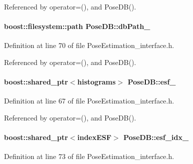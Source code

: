 Referenced by operator=(), and Pose\-D\-B().

\hypertarget{classPoseDB_ad1e3c1001be37bde48faa6502370494b}{
\paragraph[{db\-Path\-\_\-}]{\setlength{\rightskip}{0pt plus 5cm}boost\-::filesystem\-::path Pose\-D\-B\-::db\-Path\-\_\-\hspace{0.3cm}{\ttfamily [private]}}}\label{classPoseDB_ad1e3c1001be37bde48faa6502370494b}


Definition at line 70 of file Pose\-Estimation\-\_\-interface.\-h.



Referenced by operator=(), and Pose\-D\-B().

\hypertarget{classPoseDB_a658d2785a7e8f59466993864addbeb20}{
\paragraph[{esf\-\_\-}]{\setlength{\rightskip}{0pt plus 5cm}boost\-::shared\-\_\-ptr$<${\bf histograms}$>$ Pose\-D\-B\-::esf\-\_\-\hspace{0.3cm}{\ttfamily [private]}}}\label{classPoseDB_a658d2785a7e8f59466993864addbeb20}


Definition at line 67 of file Pose\-Estimation\-\_\-interface.\-h.



Referenced by operator=(), and Pose\-D\-B().

\hypertarget{classPoseDB_ae19c149b38112855a937364747edefd5}{
\paragraph[{esf\-\_\-idx\-\_\-}]{\setlength{\rightskip}{0pt plus 5cm}boost\-::shared\-\_\-ptr$<${\bf index\-E\-S\-F}$>$ Pose\-D\-B\-::esf\-\_\-idx\-\_\-\hspace{0.3cm}{\ttfamily [private]}}}\label{classPoseDB_ae19c149b38112855a937364747edefd5}


Definition at line 73 of file Pose\-Estimation\-\_\-interface.\-h.




